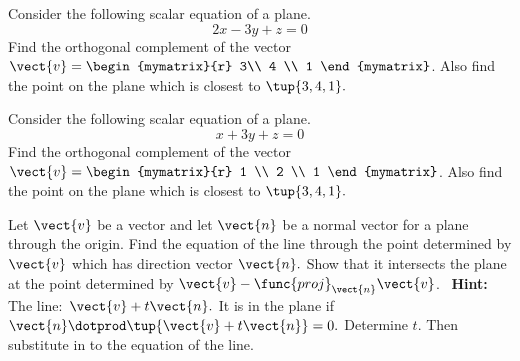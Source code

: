 \begin{enumialphparenastyle}

\begin{ex} Consider the following scalar equation of a plane. 
\begin{equation*}
2x-3y+z=0
\end{equation*}
Find the orthogonal complement of the vector $\vect{v}=\begin{mymatrix}{r}
3\\
4 \\
1
\end{mymatrix} $.
Also find the point on the plane which is closest to $\tup{3,4,1} .$
\end{ex}


\begin{ex} Consider the following scalar equation of a plane. 
\begin{equation*}
x+3y+z=0
\end{equation*}
Find the orthogonal complement of the vector $\vect{v}=\begin{mymatrix}{r}
 1 \\
2 \\
1
\end{mymatrix} $.
Also find the point on the plane which is closest to $\tup{3,4,1} .$
\end{ex}

\begin{ex} Let $\vect{v}$ be a vector and let $\vect{n}$ be a normal vector for a
plane through the origin. Find the equation of the line through the point
determined by $\vect{v}$ which has direction vector $\vect{n}.$ Show that it
intersects the plane at the point determined by $\vect{v}-\func{proj}_{\vect{n}
}\vect{v}$. \ \textbf{Hint: }The line:\ $\vect{v}+t\vect{n}.$ It is in the
plane if $\vect{n}\dotprod \tup{\vect{v}+t\vect{n}} =0.$ Determine $t$.
Then substitute in to the equation of the line.
\end{ex}


\end{enumialphparenastyle}
